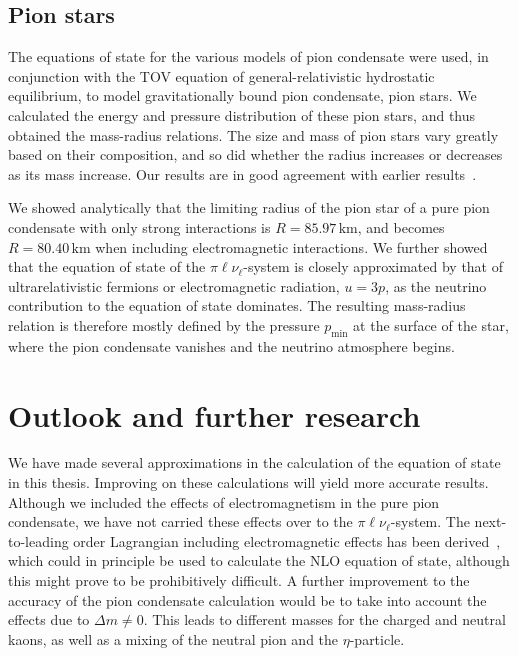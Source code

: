 \subsection{Pion stars}

The equations of state for the various models of pion condensate were used, in conjunction with the TOV equation of general-relativistic hydrostatic equilibrium, to model gravitationally bound pion condensate, pion stars.
We calculated the energy and pressure distribution of these pion stars, and thus obtained the mass-radius relations.
The size and mass of pion stars vary greatly based on their composition, and so did whether the radius increases or decreases as its mass increase.
Our results are in good agreement with earlier results~\autocite{andersenBoseEinsteinCondensationPion2018,brandtNewClassCompact2018}.

We showed analytically that the limiting radius of the pion star of a pure pion condensate with only strong interactions is $R = 85.97\,\text{km}$, and becomes $R = 80.40\,\text{km}$ when including electromagnetic interactions.
We further showed that the equation of state of the $\pi\ell\nu_\ell$-system is closely approximated by that of ultrarelativistic fermions or electromagnetic radiation, $u = 3p$, as the neutrino contribution to the equation of state dominates.
The resulting mass-radius relation is therefore mostly defined by the pressure $p_\text{min}$ at the surface of the star, where the pion condensate vanishes and the neutrino atmosphere begins.



\section{Outlook and further research}



We have made several approximations in the calculation of the equation of state in this thesis.
Improving on these calculations will yield more accurate results.
Although we included the effects of electromagnetism in the pure pion condensate, we have not carried these effects over to the $\pi\ell\nu_\ell$-system.
The next-to-leading order Lagrangian including electromagnetic effects has been derived~\autocite{urechVirtualPhotonsChiral1995}, which could in principle be used to calculate the NLO equation of state, although this might prove to be prohibitively difficult.
A further improvement to the accuracy of the pion condensate calculation would be to take into account the effects due to $\Delta m \neq 0$.
This leads to different masses for the charged and neutral kaons, as well as a mixing of the neutral pion and the $\eta$-particle.




